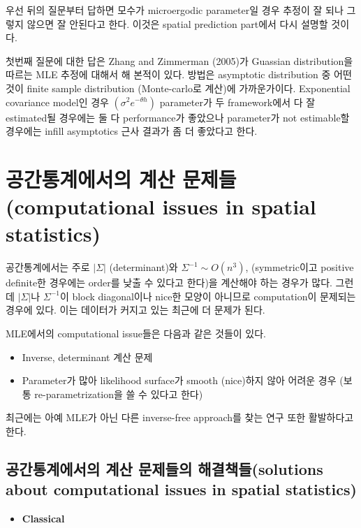 \documentclass[b5paper,]{book}
\providecommand{\tightlist}{%
  \setlength{\itemsep}{0pt}\setlength{\parskip}{0pt}}
\theoremstyle{definition}
\theoremstyle{definition}
\theoremstyle{definition}
\theoremstyle{remark}
\begin{document}
우선 뒤의 질문부터 답하면 모수가 microergodic parameter일 경우 추정이 잘
되나 그렇지 않으면 잘 안된다고 한다. 이것은 spatial prediction part에서
다시 설명할 것이다.

첫번째 질문에 대한 답은 Zhang and Zimmerman (2005)가 Guassian
distribution을 따르는 MLE 추정에 대해서 해 본적이 있다. 방법은
asymptotic distribution 중 어떤 것이 finite sample distribution
(Monte-carlo로 계산)에 가까운가이다. Exponential covariance model인 경우
\((\sigma^{2}e^{-\theta h})\) parameter가 두 framework에서 다 잘
estimated될 경우에는 둘 다 performance가 좋았으나 parameter가 not
estimable할 경우에는 infill asymptotics 근사 결과가 좀 더 좋았다고 한다.

\section{공간통계에서의 계산 문제들(computational issues in spatial
statistics)}\label{--computational-issues-in-spatial-statistics}

공간통계에서는 주로 \(|\Sigma|\) (determinant)와
\(\Sigma^{-1} \sim O(n^{3})\), (symmetric이고 positive definite한
경우에는 order를 낮출 수 있다고 한다)을 계산해야 하는 경우가 많다.
그런데 \(|\Sigma|\)나 \(\Sigma^{-1}\)이 block diagonal이나 nice한 모양이
아니므로 computation이 문제되는 경우에 있다. 이는 데이터가 커지고 있는
최근에 더 문제가 된다.

MLE에서의 computational issue들은 다음과 같은 것들이 있다.

\begin{itemize}
\item
  Inverse, determinant 계산 문제
\item
  Parameter가 많아 likelihood surface가 smooth (nice)하지 않아 어려운
  경우 (보통 re-parametrization을 쓸 수 있다고 한다)
\end{itemize}

최근에는 아예 MLE가 아닌 다른 inverse-free approach를 찾는 연구 또한
활발하다고 한다.

\subsection{공간통계에서의 계산 문제들의 해결책들(solutions about
computational issues in spatial
statistics)}\label{---solutions-about-computational-issues-in-spatial-statistics}

\begin{itemize}
\tightlist
\item
  \textbf{Classical}
\end{itemize}
\end{document}
